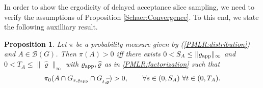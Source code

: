 \documentclass[sn-mathphys-num]{sn-jnl}%
\theoremstyle{thmstyleone}%
\newtheorem{proposition}[theorem]{Proposition}%
\theoremstyle{thmstyletwo}%
\theoremstyle{thmstylethree}%
\newcommand{\rhoapp}{\varrho_{{\rm app}}}
\begin{document}
\begin{appendices}



In order to show the ergodicity of delayed acceptance slice sampling, we need to verify the assumptions of Proposition \ref{Schaer:Convergence}.
To this end, we state the following auxilliary result.

\begin{proposition}\label{positive:measure:iff}
    Let $\pi$ be a probability measure given by (\ref{PMLR:distribution}) and $A\in\mathcal{B}(G)$. Then 
    $\pi(A)>0$ iff there exists $0<S_A\leq \|\rhoapp\|_\infty$ and $0 < T_A \leq \|\widehat{\varrho}\|_\infty$ with $\rhoapp, \widehat{\varrho}$ as in \eqref{PMLR:factorization} such that
    \begin{align*}
        \pi_0(A\cap G_{s, \varrho_{\textmd{app}}}\cap G_{t, \widehat{\varrho}}) > 0, \qquad  \forall s\in(0, S_A) \ \forall t\in(0, T_A).   
    \end{align*}
\end{proposition}


\end{appendices}
\end{document}
